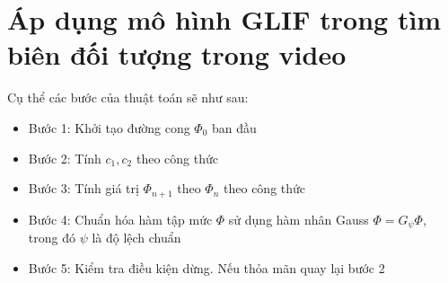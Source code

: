 \documentclass[12pt,oneside,a4]{report}
\begin{document}
\chapter{Áp dụng mô hình GLIF trong tìm biên đối tượng trong video }
Cụ thể các bước của thuật toán sẽ như sau:
\begin{itemize}
\item Bước 1: Khởi tạo đường cong $\Phi_0$ ban đầu
\item Bước 2: Tính $c_1, c_2$ theo công thức 
\item Bước 3: Tính giá trị $\Phi_{n+1}$ theo $\Phi_{n}$ theo công thức 
\item Bước 4: Chuẩn hóa hàm tập mức $\Phi$ sử dụng hàm nhân Gauss $\Phi=G_{\psi}\Phi$, trong đó $\psi$ là độ lệch chuẩn
\item Bước 5: Kiểm tra điều kiện dừng. Nếu thỏa mãn quay lại bước 2

\end{itemize}
\end{document}
